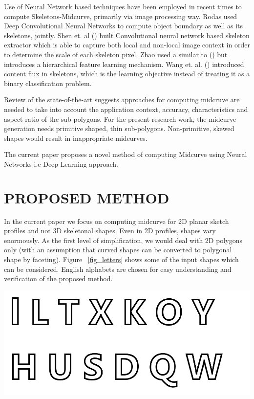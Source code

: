 \documentclass[9pt,academicons]{article}
\begin{document}
Use of Neural Network based techniques have been employed in recent times to compute Skeletons-Midcurve, primarily via image processing way. Rodas \cite{Rodas2019JointOB} used Deep Convolutional Neural Networks to compute object boundary as well as its skeletons, jointly. Shen et. al (\cite{shen2016object,Shen_2017}) built Convolutional neural network based skeleton extractor which is able to capture both local and non-local image context in order to determine the scale of each skeleton pixel. Zhao \cite{zhao2018hifi} used a similar to (\cite{shen2016object,Shen_2017}) but introduces a hierarchical feature learning mechanism. Wang et. al. (\cite{wang2018deepflux}) introduced content flux in skeletons, which is
the learning objective instead of treating it as a binary classification problem.
	
Review of the state-of-the-art suggests approaches for computing midcruve are needed to take into account the application context, accuracy, characteristics  and aspect ratio of the sub-polygons. For the present research work, the midcurve generation needs primitive shaped, thin sub-polygons. Non-primitive, skewed shapes would result in inappropriate midcurves.

 The current paper proposes a novel method of computing Midcurve using Neural Networks i.e Deep Learning approach.
 
 
\section{PROPOSED METHOD}
\label{sec:proposedmethod}

In the current paper we focus on computing midcurve for 2D planar sketch profiles and not 3D skeletonal shapes.  Even in 2D profiles, shapes vary enormously. As the first level of simplification, we would deal with 2D polygons only (with an assumption that curved shapes can be converted to polygonal shape by faceting). Figure ~\ref{fig_letters} shows some of the input shapes which can be considered. English alphabets are chosen for easy understanding and verification of the proposed method.

     \begin{center}
	\includegraphics[width=0.8\linewidth]{images/Letters}
	\label{fig_letters}
    \end{center}
		
\end{document}
